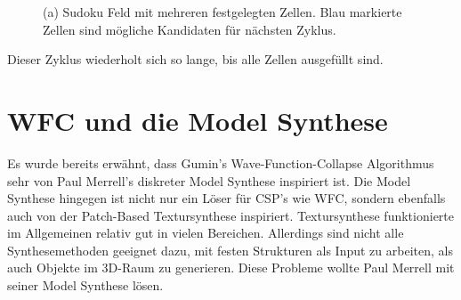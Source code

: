 \documentclass[12pt, a4paper,twoside,openright]{report} %
\begin{document}
\begin{figure}[H]
    \centering
    \caption{(a) Sudoku Feld mit mehreren festgelegten Zellen. Blau markierte Zellen sind mögliche Kandidaten für nächsten Zyklus.}%
\end{figure}

Dieser Zyklus wiederholt sich so lange, bis alle Zellen ausgefüllt sind.

\section{WFC und die Model Synthese}

Es wurde bereits erwähnt, dass Gumin's Wave-Function-Collapse Algorithmus sehr von Paul Merrell's diskreter Model Synthese inspiriert ist.
Die Model Synthese hingegen ist nicht nur ein Löser für CSP's wie WFC, sondern ebenfalls auch von der Patch-Based Textursynthese inspiriert.
\newline
Textursynthese funktionierte im Allgemeinen relativ gut in vielen Bereichen.
Allerdings sind nicht alle Synthesemethoden geeignet dazu, mit festen Strukturen als Input zu arbeiten, als auch Objekte im 3D-Raum zu generieren.
Diese Probleme wollte Paul Merrell mit seiner Model Synthese lösen.
\end{document}
